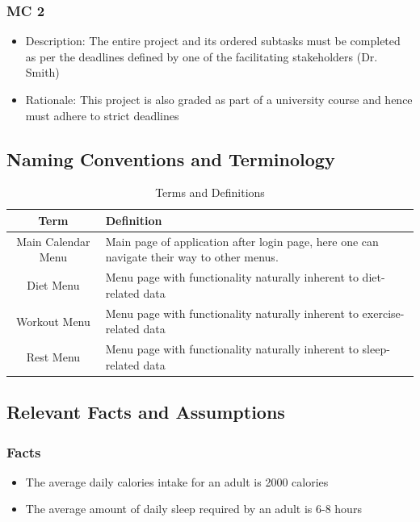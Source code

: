 \documentclass[12pt,letterpaper]{article}
\begin{document}
\subsubsection{MC 2}
\begin{itemize}
	\item Description: The entire project and its ordered subtasks must be completed as per the deadlines defined by one of the facilitating stakeholders (Dr. Smith)
	\item Rationale: This project is also graded as part of a university course and hence must adhere to strict deadlines
\end{itemize}

\subsection{Naming Conventions and Terminology}
\label{sub:Naming Conventions and Terminology}
\begin{table}[H]
	\caption{Terms and Definitions}
	\centering
	\begin{tabular}{|c|p{10cm}|}
		\hline
		\textbf{Term} & \textbf{Definition}\\
		\hline
		Main Calendar Menu & Main page of application after login page, here one can navigate their way to other menus.\\
		\hline
		Diet Menu & Menu page with functionality naturally inherent to diet-related data\\
		\hline
		Workout Menu & Menu page with functionality naturally inherent to exercise-related data\\
		\hline
		Rest Menu &Menu page with functionality naturally inherent to sleep-related data\\
		\hline
	\end{tabular}
\end{table}


\subsection{Relevant Facts and Assumptions}
\subsubsection{Facts}
\begin{itemize}
	\item The average daily calories intake for an adult is 2000 calories
	\item The average amount of daily sleep required by an adult is 6-8 hours
\end{itemize}
\end{document}
